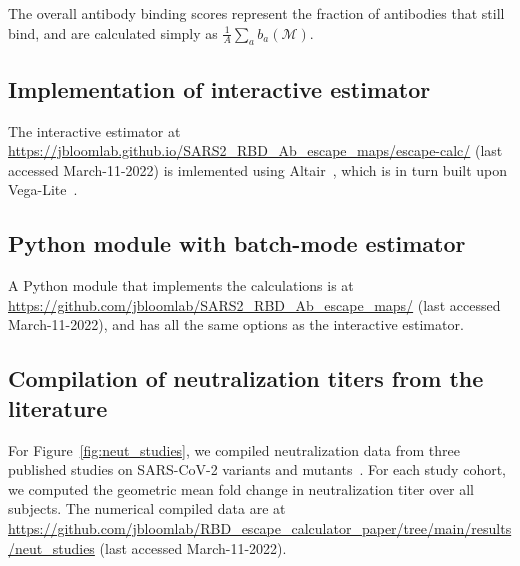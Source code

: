 \documentclass[9pt,twocolumn,twoside]{gsajnl_modified}
\begin{document}
{The overall antibody binding scores represent the fraction of antibodies that still bind, and are calculated simply as $\frac{1}{A}\sum_a b_a\left(\mathcal{M}\right)$.

\subsection{Implementation of interactive estimator}
The interactive estimator at \url{https://jbloomlab.github.io/SARS2_RBD_Ab_escape_maps/escape-calc/} (last accessed March-11-2022) is imlemented using Altair~\citep{VanderPlas2018}, which is in turn built upon Vega-Lite~\citep{Satyanarayan2017}.

\subsection{Python module with batch-mode estimator}
A Python module that implements the calculations is at \url{https://github.com/jbloomlab/SARS2_RBD_Ab_escape_maps/} (last accessed March-11-2022), and has all the same options as the interactive estimator.

\subsection{Compilation of neutralization titers from the literature}
For Figure~\ref{fig:neut_studies}, we compiled neutralization data from three published studies on SARS-CoV-2 variants and mutants~\citep{lucas2021impact,uriu2021neutralization,wang2021antibody}.
For each study cohort, we computed the geometric mean fold change in neutralization titer over all subjects.
The numerical compiled data are at \url{https://github.com/jbloomlab/RBD_escape_calculator_paper/tree/main/results/neut_studies} (last accessed March-11-2022).

}
\end{document}
